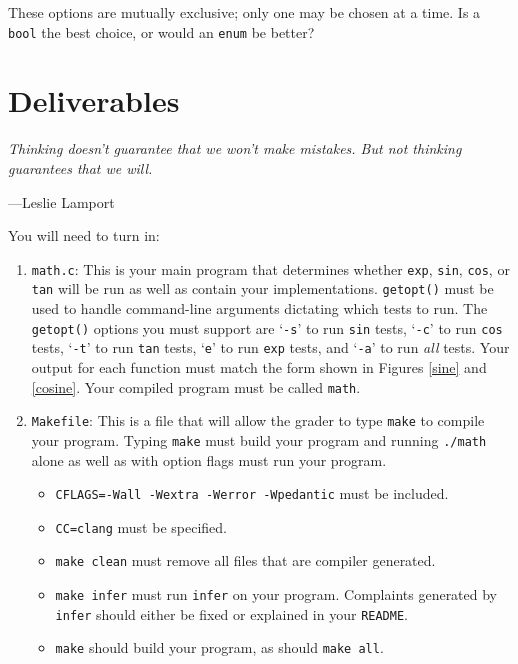 \documentclass[11pt]{article}
\begin{document}
These options are mutually exclusive; only one may be chosen at a time. Is a
\texttt{bool} the best choice, or would an \texttt{enum} be better?

\section{Deliverables}
\epigraph{\emph{Thinking doesn't guarantee that we won't make mistakes. But
not thinking guarantees that we will.}}{---Leslie Lamport}

\noindent You will need to turn in:

\begin{enumerate}
  \item \texttt{math.c}: This is your main program that determines whether
      \texttt{exp}, \texttt{sin}, \texttt{cos}, or \texttt{tan} will be run as
      well as contain your implementations. \texttt{getopt()} must be used to
      handle command-line arguments dictating which tests to run.
        The \texttt{getopt()} options you must support are
        `\texttt{-s}' to run \texttt{sin} tests, `\texttt{-c}' to run
        \texttt{cos} tests, `\texttt{-t}' to run \texttt{tan} tests,
        `\texttt{e}' to run \texttt{exp} tests, and `\texttt{-a}' to run
        \emph{all} tests. Your output for each function must match the form
        shown in Figures \ref{sine} and \ref{cosine}.
        Your compiled program must be called \texttt{math}.

  \item \texttt{Makefile}: This is a file that will allow the grader to type
      \texttt{make} to compile your program. Typing \texttt{make} must build
        your program and running \texttt{./math} alone as well as with option flags must run your program.
  \begin{itemize}
    \item \texttt{CFLAGS=-Wall -Wextra -Werror -Wpedantic} must be included.
    \item \texttt{CC=clang} must be specified.
    \item \texttt{make clean} must remove all files that are compiler generated.
    \item \texttt{make infer} must run \texttt{infer} on your program.
        Complaints generated by \texttt{infer} should either be fixed or
        explained in your \texttt{README}.
    \item \texttt{make} should build your program, as should \texttt{make all}.
  \end{itemize}


\end{enumerate}
\end{document}

